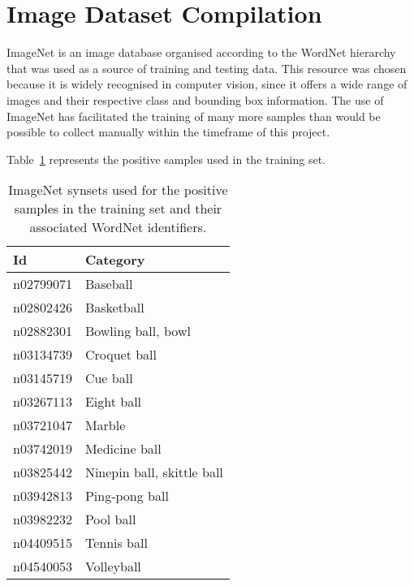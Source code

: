 \documentclass{llncs}
\begin{document}
	\section{Image Dataset Compilation} {
	\label{sec:dataset}


		ImageNet is an image database organised according to the WordNet hierarchy \citep{imagenet_cvpr09, fellbaum1998wordnet} that was used as a source of training and testing data. This resource was chosen because it is widely recognised in computer vision, since it offers a wide range of images and their respective class and bounding box information. The use of ImageNet has facilitated the training of many more samples than would be possible to collect manually within the timeframe of this project.

		Table~\ref{tab:positive_samples} represents the positive samples used in the training set.

		\begin{table}
			\centering
			\caption{ImageNet synsets used for the positive samples in the training set and their associated WordNet identifiers.}
			\label{tab:positive_samples}
			\begin{tabularx}{\textwidth}{lX}
				\toprule
				\textbf{Id} & \textbf{Category} \\
				\midrule
					n02799071 & Baseball \\
					n02802426 & Basketball \\
					n02882301 & Bowling ball, bowl \\
					n03134739 & Croquet ball \\
					n03145719 & Cue ball \\
					n03267113 & Eight ball \\
					n03721047 & Marble \\
					n03742019 & Medicine ball \\
					n03825442 & Ninepin ball, skittle ball \\
					n03942813 & Ping-pong ball \\
					n03982232 & Pool ball \\
					n04409515 & Tennis ball \\
					n04540053 & Volleyball \\
				\bottomrule
			\end{tabularx}
		\end{table}

}
\end{document}
